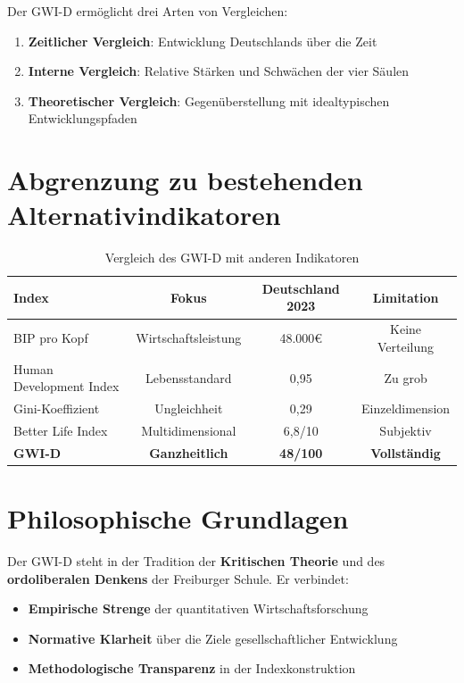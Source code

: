 Der GWI-D ermöglicht drei Arten von Vergleichen:
\begin{enumerate}
\item \textbf{Zeitlicher Vergleich}: Entwicklung Deutschlands über die Zeit
\item \textbf{Interne Vergleich}: Relative Stärken und Schwächen der vier Säulen
\item \textbf{Theoretischer Vergleich}: Gegenüberstellung mit idealtypischen Entwicklungspfaden
\end{enumerate}

\section{Abgrenzung zu bestehenden Alternativindikatoren}

\begin{table}[h]
\centering
\begin{tabular}{lccc}
\toprule
\textbf{Index} & \textbf{Fokus} & \textbf{Deutschland 2023} & \textbf{Limitation} \\
\midrule
BIP pro Kopf & Wirtschaftsleistung & 48.000€ & Keine Verteilung \\
Human Development Index & Lebensstandard & 0,95 & Zu grob \\
Gini-Koeffizient & Ungleichheit & 0,29 & Einzeldimension \\
Better Life Index & Multidimensional & 6,8/10 & Subjektiv \\
\textbf{GWI-D} & \textbf{Ganzheitlich} & \textbf{48/100} & \textbf{Vollständig} \\
\bottomrule
\end{tabular}
\caption{Vergleich des GWI-D mit anderen Indikatoren}
\label{tab:vergleich-indikatoren}
\end{table}

\section{Philosophische Grundlagen}

Der GWI-D steht in der Tradition der \textbf{Kritischen Theorie} und des \textbf{ordoliberalen Denkens} der Freiburger Schule. Er verbindet:

\begin{itemize}
\item \textbf{Empirische Strenge} der quantitativen Wirtschaftsforschung
\item \textbf{Normative Klarheit} über die Ziele gesellschaftlicher Entwicklung
\item \textbf{Methodologische Transparenz} in der Indexkonstruktion
\end{itemize}

